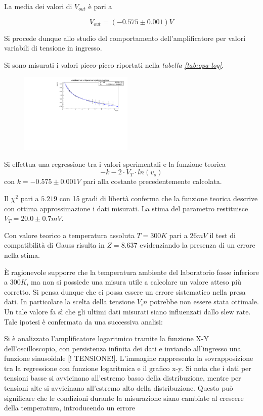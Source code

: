 \documentclass[journal]{IEEEtran}
\begin{document}
La media dei valori di $V_{out}$ è pari a 

\[V_{out} = (-0.575 \pm 0.001 )V\]

Si procede dunque allo studio del comportamento dell'amplificatore per valori variabili di tensione in ingresso.

Si sono misurati i valori picco-picco riportati nella \textit{tabella \ref{tab:opa-log}}.


\begin{figure}[H]%
\begin {center}
\includegraphics[width=0.48\textwidth]{analysis/output/fit_log_vout_vin.pdf}
\caption{}
\label{fig:log_ampl_fit}
\end {center}
\end{figure}

Si effettua una regressione tra i valori sperimentali e la funzione teorica 
\begin{equation}
-k - 2 \cdot V_T \cdot ln(v_s)
\end{equation}
con $k = -0.575 \pm 0.001 V$ pari alla costante precedentemente calcolata.

Il $\chi^2$ pari a $5.219$ con 15 gradi di libertà conferma che la funzione teorica descrive con ottima approssimazione i dati misurati.
La stima del parametro restituisce $V_T = 20.0 \pm 0.7 mV$.

Con valore teorico a temperatura assoluta $T = 300K$ pari a $26 mV$ il test di compatibilità di Gauss risulta in $Z = 8.637$ evidenziando la presenza di un errore nella stima.

È ragionevole supporre che la temperatura ambiente del laboratorio fosse inferiore a $300 K$, ma non si possiede una misura utile a calcolare un valore atteso più corretto.
Si pensa dunque che ci possa essere un errore sistematico nella presa dati. In particolare la scelta della tensione $V_in$ potrebbe non essere stata ottimale. Un tale valore
fa sì che gli ultimi dati misurati siano influenzati dallo slew rate. Tale ipotesi è confermata da una successiva analisi:

Si è analizzato l'amplificatore logaritmico tramite la funzione X-Y dell'oscilloscopio, con persistenza infinita dei dati e inviando all'ingresso una funzione sinusoidale [!
TENSIONE!]. L'immagine rappresenta la sovrapposizione tra la regressione con funzione logaritmica e il grafico x-y. Si nota che i dati per tensioni basse si avvicinano
all'estremo basso della distribuzione, mentre per tensioni alte si avvicinano all'estremo alto della distribuzione. Questo può significare che le condizioni durante la
misurazione siano cambiate al crescere della temperatura, introducendo un errore
\end{document}
